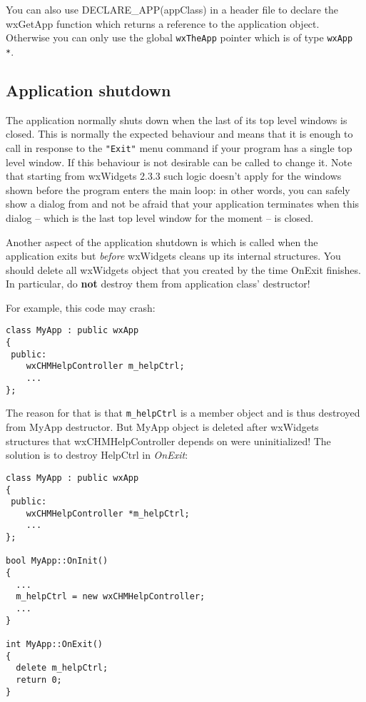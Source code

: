 You can also use DECLARE\_APP(appClass) in a header file to declare the wxGetApp function which returns
a reference to the application object. Otherwise you can only use the global 
\texttt{wxTheApp} pointer which is of type \texttt{wxApp *}.


\subsection{Application shutdown}\label{wxappshutdownoverview}

The application normally shuts down when the last of its top level windows is
closed. This is normally the expected behaviour and means that it is enough to
call  in response to the {\tt "Exit"} menu
command if your program has a single top level window. If this behaviour is not
desirable  can
be called to change it. Note that starting from wxWidgets 2.3.3 such logic
doesn't apply for the windows shown before the program enters the main loop: in
other words, you can safely show a dialog from 
 and not be afraid that your application
terminates when this dialog -- which is the last top level window for the
moment -- is closed.


Another aspect of the application shutdown is  
which is called when the application exits but {\it before} wxWidgets cleans up
its internal structures. You should delete all wxWidgets object that you
created by the time OnExit finishes. In particular, do {\bf not} destroy them
from application class' destructor!

For example, this code may crash:

\begin{verbatim}
class MyApp : public wxApp
{
 public:
    wxCHMHelpController m_helpCtrl;
    ...
};
\end{verbatim}

The reason for that is that {\tt m\_helpCtrl} is a member object and is 
thus destroyed from MyApp destructor. But MyApp object is deleted after 
wxWidgets structures that wxCHMHelpController depends on were 
uninitialized! The solution is to destroy HelpCtrl in {\it OnExit}:

\begin{verbatim}
class MyApp : public wxApp
{
 public:
    wxCHMHelpController *m_helpCtrl;
    ...
};

bool MyApp::OnInit()
{
  ...
  m_helpCtrl = new wxCHMHelpController;
  ...
}

int MyApp::OnExit()
{
  delete m_helpCtrl;
  return 0;
}
\end{verbatim}


